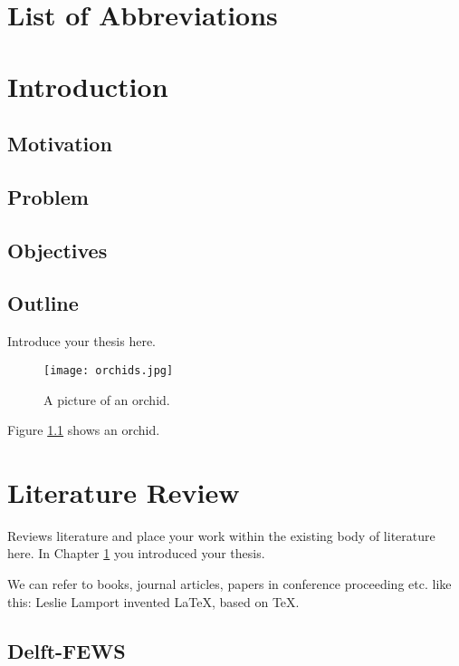 \documentclass[a4paper,oneside,12pt]{report}
\begin{document}
\chapter*{List of Abbreviations}


\chapter{Introduction}
\label{ch:intro}

\section{Motivation}

\section{Problem}

\section{Objectives}

\section{Outline}

Introduce your thesis here.
\begin{figure}
\begin{center}
  \texttt{[image: orchids.jpg]}\\
  \caption{A picture of an orchid.}\label{fi:orchid}
\end{center}
\end{figure}
Figure \ref{fi:orchid} shows an orchid.


\chapter{Literature Review}
\label{ch:literature}

Reviews literature and place your work within the existing body of literature here. In Chapter \ref{ch:intro} you introduced your thesis.

We can refer to books, journal articles, papers in conference proceeding etc. like this: Leslie Lamport \cite{Akka.ioWhenCluster} invented \LaTeX, based on \TeX.

\section{Delft-FEWS}
\end{document}
